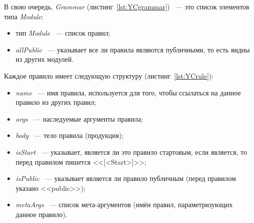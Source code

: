 \documentclass[14pt]{matmex-diploma}
\begin{document}
В свою очередь, \textit{Grammar} (листинг~\ref{lst:YCgrammar}) ~--- это список элементов типа \textit{Module}:
\begin{itemize}
\item
тип \textit{Module} ~--- список правил;
\item
\textit{allPublic} ~--- указывает все ли правила являются публичными, то есть видны из других модулей.
\end{itemize}



Каждое правило имеет следующую структуру (листинг~\ref{lst:YCrule}):
\begin{itemize}
\item
\textit{name} ~--- имя правила, используется для того, чтобы ссылаться на данное правило из других правил;
\item
\textit{args} ~--- наследуемые аргументы правила;
\item
\textit{body} ~--- тело правила (продукция);
\item
\textit{isStart} ~--- указывает, является ли это правило стартовым, если является, то перед правилом пишется <<[<Start>]>>;
\item
\textit{isPublic} ~--- указывает является ли правило публичным (перед правилом указано <<public>>);
\item
\textit{metaArgs} ~--- список мета-аргументов (имён правил, параметризующих данное правило).
\end{itemize}

\end{document}
